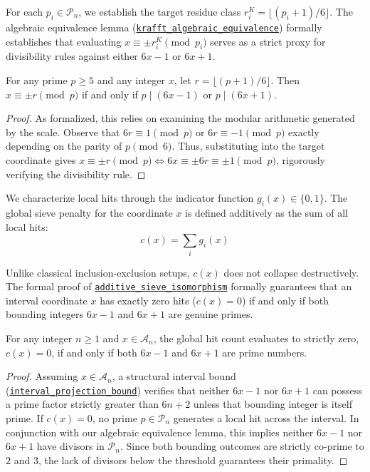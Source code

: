 \documentclass[lean]{AFM}
\renewcommand{\.}{\hskip .75pt}
\def\urlpfx{https://github.com/ElNando888/KrafftSieve/blob/v1.2}
\begin{document}
For each $p_i \in \mathcal{P}_n$, we establish the target residue class
$r^K_i = \lfloor (p_i + 1) / 6 \rfloor$. The algebraic equivalence lemma
(\href{\urlpfx/KrafftSieve/SelbergWeights.lean#L81}{\texttt{krafft\_algebraic\_equivalence}})
formally establishes that evaluating $x \equiv \pm r^K_i \pmod{p_i}$ serves as a strict
proxy for divisibility rules against either $6x-1$ or $6x+1$. 

\begin{lemma}
For any prime $p \ge 5$ and any integer $x$, let $r = \lfloor(p+1)/6\rfloor$. Then
$x \equiv \pm r \pmod{p}$ if and only if $p \mid (6x-1)$ or $p \mid (6x+1)$.
\end{lemma}
\begin{proof}
As formalized, this relies on examining the modular arithmetic generated by the scale. Observe that
$6r \equiv 1 \pmod{p}$ or $6r \equiv -1 \pmod{p}$ exactly depending on the parity of $p \pmod{6}$.
Thus, substituting into the target coordinate gives
$x \equiv \pm r \pmod{p} \iff 6x \equiv \pm 6r \equiv \pm 1 \pmod{p}$, rigorously verifying the
divisibility rule.
\end{proof}

We characterize local hits through the indicator function $g_i(x) \in \{0, 1\}$. The global sieve
penalty for the coordinate $x$ is defined additively as the sum of all local hits:
$$ c(x) = \sum_{i} g_i(x) $$ 

Unlike classical inclusion-exclusion setups, $c(x)$ does not collapse destructively. The formal
proof of \href{\urlpfx/KrafftSieve/SelbergWeights.lean#L286}{\texttt{additive\_sieve\_isomorphism}}
formally guarantees that an interval coordinate $x$ has exactly zero hits ($c(x) = 0$) if and only
if both bounding integers $6x-1$ and $6x+1$ are genuine primes.  

\begin{theorem}
For any integer $n \ge 1$ and $x \in \mathcal{A}_n$, the global hit count evaluates to strictly
zero, $c(x) = 0$, if and only if both $6x-1$ and $6x+1$ are prime numbers.
\end{theorem}
\begin{proof}
Assuming $x \in \mathcal{A}_n$, a structural interval bound
(\href{\urlpfx/KrafftSieve/SelbergWeights.lean#L111}{\texttt{interval\_projection\_bound}})
verifies that neither $6x-1$ nor $6x+1$ can possess a prime factor strictly greater than $6n+2$
unless that bounding integer is itself prime. If $c(x) = 0$, no prime $p \in \mathcal{P}_n$
generates a local hit across the interval. In conjunction with our algebraic equivalence lemma,
this implies neither $6x-1$ nor $6x+1$ have divisors in $\mathcal{P}_n$. Since both bounding
outcomes are strictly co-prime to $2$ and $3$, the lack of divisors below the threshold guarantees
their primality.
\end{proof}
\end{document}
